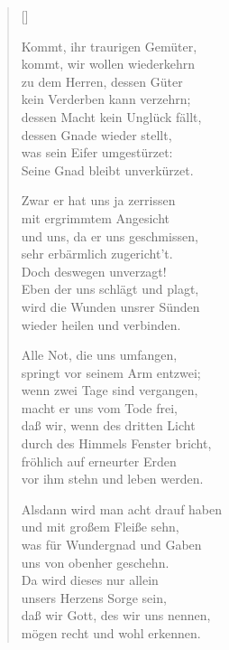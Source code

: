 \begin{multicols}{2}
\settowidth{\versewidth}{Zwar er hat uns ja zerrissen}
\begin{verse}[\versewidth]

 Kommt, ihr traurigen Gemüter,\\
kommt, wir wollen wiederkehrn\\
zu dem Herren, dessen Güter\\
kein Verderben kann verzehrn;\\
dessen Macht kein Unglück fällt,\\
dessen Gnade wieder stellt,\\
was sein Eifer umgestürzet:\\
Seine Gnad bleibt unverkürzet.

 Zwar er hat uns ja zerrissen\\
mit ergrimmtem Angesicht\\
und uns, da er uns geschmissen,\\
sehr erbärmlich zugericht't.\\
Doch deswegen unverzagt!\\
Eben der uns schlägt und plagt,\\
wird die Wunden unsrer Sünden\\
wieder heilen und verbinden.

 Alle Not, die uns umfangen,\\
springt vor seinem Arm entzwei;\\
wenn zwei Tage sind vergangen,\\
macht er uns vom Tode frei,\\
daß wir, wenn des dritten Licht\\
durch des Himmels Fenster bricht,\\
fröhlich auf erneurter Erden\\
vor ihm stehn und leben werden.

 Alsdann wird man acht drauf haben\\
und mit großem Fleiße sehn,\\
was für Wundergnad und Gaben\\
uns von obenher geschehn.\\
Da wird dieses nur allein\\
unsers Herzens Sorge sein,\\
daß wir Gott, des wir uns nennen,\\
mögen recht und wohl erkennen.


\end{verse}
\end{multicols}
